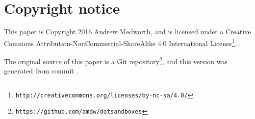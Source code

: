 \documentclass[a4paper,twocolumn]{article}
\begin{document}
\section*{Copyright notice}

This paper is Copyright 2016 Andrew Medworth, and is licensed under a
Creative Commons Attribution-NonCommercial-ShareAlike 4.0
International
License\footnote{\texttt{http://creativecommons.org/licenses/by-nc-sa/4.0/}}.

 The original source of this paper is a Git
repository\footnote{\texttt{https://github.com/amdw/dotsandboxes}},
and this version was generated from commit \VCRevisionMod.
\end{document}
